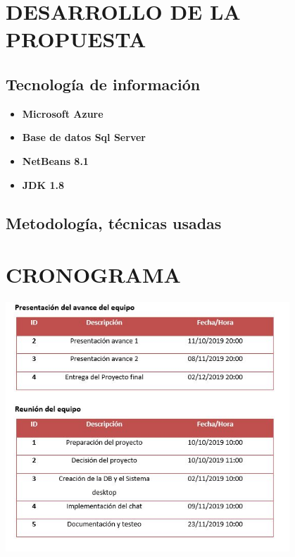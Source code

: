 \documentclass[12pt,letterpaper]{article}
\begin{document}
\section{DESARROLLO DE LA PROPUESTA}
	\subsection{Tecnología de información}
	\begin{itemize}
	\item \textbf{Microsoft Azure} \\ 
	\item \textbf{Base de datos Sql Server} \\ 
\item \textbf{NetBeans 8.1} \\ 
\item \textbf{JDK 1.8} \\ 


\end{itemize}
	\subsection{Metodología, técnicas usadas}

\section{CRONOGRAMA}

\begin{center}
\includegraphics[width=0.8\textwidth]{./Imagenes/cronograma}

\end{center}

\cite{1}


\end{document}
